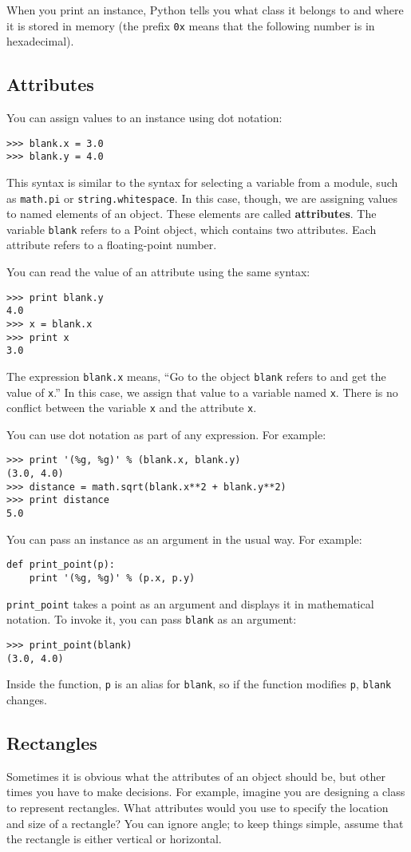 \documentclass{article}
\begin{document}
\begin{multicols}{2}
When you print an instance, Python tells you what
class it belongs to and where it is stored in memory (the prefix
\verb|0x| means that the following number is in hexadecimal).

\subsection{Attributes}
You can assign values to an instance using dot notation:
\begin{lstlisting}
>>> blank.x = 3.0
>>> blank.y = 4.0
\end{lstlisting}
This syntax is similar to the syntax for selecting a variable from a
module, such as \verb|math.pi| or \verb|string.whitespace|.
In this case, though, we are assigning values to named elements of
an object. These elements are called \textbf{attributes}.
The variable \verb|blank| refers to a Point object, which contains
two attributes. Each attribute refers to a floating-point number.

You can read the value of an attribute using the same syntax:
\begin{lstlisting}
>>> print blank.y
4.0
>>> x = blank.x
>>> print x
3.0
\end{lstlisting}
The expression \verb|blank.x| means, ``Go to the object \verb|blank| refers
to and get the value of \verb|x|.'' In this case, we assign that value to a
variable named \verb|x|.  There is no conflict between the variable
\verb|x| and the attribute \verb|x|.

You can use dot notation as part of any expression. For example:
\begin{verbatim}
>>> print '(%g, %g)' % (blank.x, blank.y)
(3.0, 4.0)
>>> distance = math.sqrt(blank.x**2 + blank.y**2)
>>> print distance
5.0
\end{verbatim}
You can pass an instance as an argument in the usual way. For example:
\begin{verbatim}
def print_point(p):
    print '(%g, %g)' % (p.x, p.y)
\end{verbatim}
\verb|print_point| takes a point as an argument and displays it in
mathematical notation. To invoke it, you can pass \verb|blank| as an
argument:
\begin{lstlisting}
>>> print_point(blank)
(3.0, 4.0)
\end{lstlisting}
Inside the function, \verb|p| is an alias for \verb|blank|, so if the
function modifies \verb|p|, \verb|blank| changes.
\subsection{Rectangles}
Sometimes it is obvious what the attributes of an object should be, but
other times you have to make decisions. For example, imagine you are
designing a class to represent rectangles. What attributes would you use to
specify the location and size of a rectangle? You can ignore angle; to keep
things simple, assume that the rectangle is either vertical or horizontal.


\end{multicols}
\end{document}
